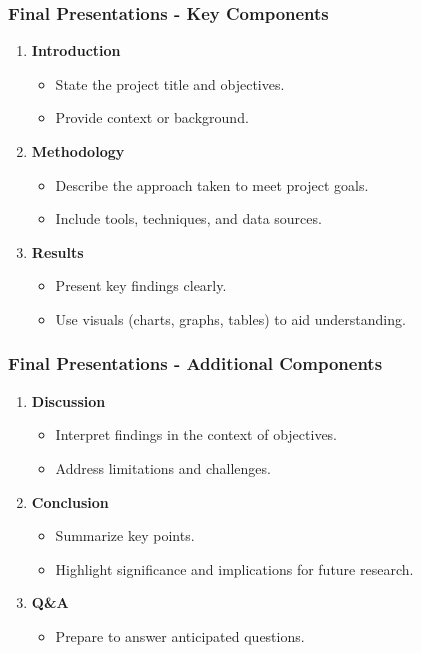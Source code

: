 \documentclass{beamer}
\begin{document}
\begin{frame}[fragile]
    \frametitle{Final Presentations - Key Components}
    \begin{enumerate}
        \item \textbf{Introduction}
        \begin{itemize}
            \item State the project title and objectives.
            \item Provide context or background.
        \end{itemize}
        
        \item \textbf{Methodology}
        \begin{itemize}
            \item Describe the approach taken to meet project goals.
            \item Include tools, techniques, and data sources.
        \end{itemize}

        \item \textbf{Results}
        \begin{itemize}
            \item Present key findings clearly.
            \item Use visuals (charts, graphs, tables) to aid understanding.
        \end{itemize}
    \end{enumerate}
\end{frame}

\begin{frame}[fragile]
    \frametitle{Final Presentations - Additional Components}
    \begin{enumerate}[resume]
        \item \textbf{Discussion}
        \begin{itemize}
            \item Interpret findings in the context of objectives.
            \item Address limitations and challenges.
        \end{itemize}
        
        \item \textbf{Conclusion}
        \begin{itemize}
            \item Summarize key points.
            \item Highlight significance and implications for future research.
        \end{itemize}

        \item \textbf{Q\&A}
        \begin{itemize}
            \item Prepare to answer anticipated questions.
        \end{itemize}
    \end{enumerate}
\end{frame}
\end{document}
